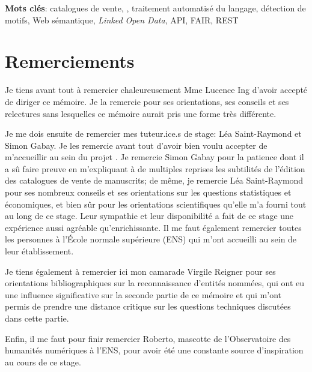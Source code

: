 \noindent\textbf{Mots clés}: catalogues de vente, \mssktb, traitement automatisé du langage, détection de motifs, Web sémantique, \textit{Linked Open Data}, API, FAIR, REST

\chapter*{Remerciements}
Je tiens avant tout à remercier chaleureusement Mme Lucence Ing d'avoir accepté de diriger ce mémoire. Je la remercie pour ses orientations, ses conseils et ses relectures sans lesquelles ce mémoire aurait pris une forme très différente.

Je me dois ensuite de remercier mes tuteur.ice.s de stage: Léa Saint-Raymond et Simon Gabay. Je les remercie avant tout d'avoir bien voulu accepter de m'accueillir au sein du projet \mssktb{}. Je remercie Simon Gabay pour la patience dont il a sû faire preuve en m'expliquant à de multiples reprises les subtilités de l'édition \xmltei{} des catalogues de vente de manuscrits; de même, je remercie Léa Saint-Raymond pour ses nombreux conseils et ses orientations sur les questions statistiques et économiques, et bien sûr pour les orientations scientifiques qu'elle m'a fourni tout au long de ce stage. Leur sympathie et leur disponibilité a fait de ce stage une expérience aussi agréable qu'enrichissante. Il me faut également remercier toutes les personnes à l'École normale supérieure (ENS) qui m'ont accueilli au sein de leur établissement.

Je tiens également à remercier ici mon camarade Virgile Reigner pour ses orientations bibliographiques sur la reconnaissance d'entités nommées, qui ont eu une influence significative sur la seconde partie de ce mémoire et qui m'ont permis de prendre une distance critique sur les questions techniques discutées dans cette partie.

Enfin, il me faut pour finir remercier Roberto, mascotte de l'Observatoire des humanités numériques à l'ENS, pour avoir été une constante source d'inspiration au cours de ce stage.

\mainmatter
